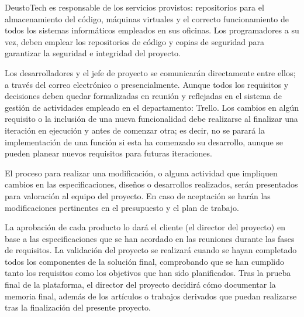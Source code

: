 DeustoTech es responsable de los servicios provistos: repositorios para el
almacenamiento del código, máquinas virtuales y el correcto funcionamiento de
todos los sistemas informáticos empleados en sus oficinas. Los programadores a
su vez, deben emplear los repositorios de código y copias de seguridad para
garantizar la seguridad e integridad del proyecto.

Los desarrolladores y el jefe de proyecto se comunicarán directamente entre
ellos; a través del correo electrónico o presencialmente. Aunque todos los
requisitos y decisiones deben quedar formalizadas en reunión y reflejadas en
el sistema de gestión de actividades empleado en el departamento: Trello. Los
cambios en algún requisito o la inclusión de una nueva funcionalidad debe
realizarse al finalizar una iteración en ejecución y antes de comenzar otra;
es decir, no se parará la implementación de una función si esta ha comenzado
su desarrollo, aunque se pueden planear nuevos requisitos para futuras
iteraciones.

El proceso para realizar una modificación, o alguna actividad que impliquen
cambios en las especificaciones, diseños o desarrollos realizados, serán
presentados para valoración al equipo del proyecto. En caso de aceptación se
harán las modificaciones pertinentes en el presupuesto y el plan de trabajo.

La aprobación de cada producto lo dará el cliente (el director del proyecto) en
base a las especificaciones que se han acordado en las reuniones durante las
fases de requisitos. La validación del proyecto se realizará cuando se hayan
completado todos los componentes de la solución final, comprobando que se han
cumplido tanto los requisitos como los objetivos que han sido planificados.
Tras la prueba final de la plataforma, el director del proyecto decidirá cómo
documentar la memoria final, además de los artículos o trabajos derivados que
puedan realizarse tras la finalización del presente proyecto.
